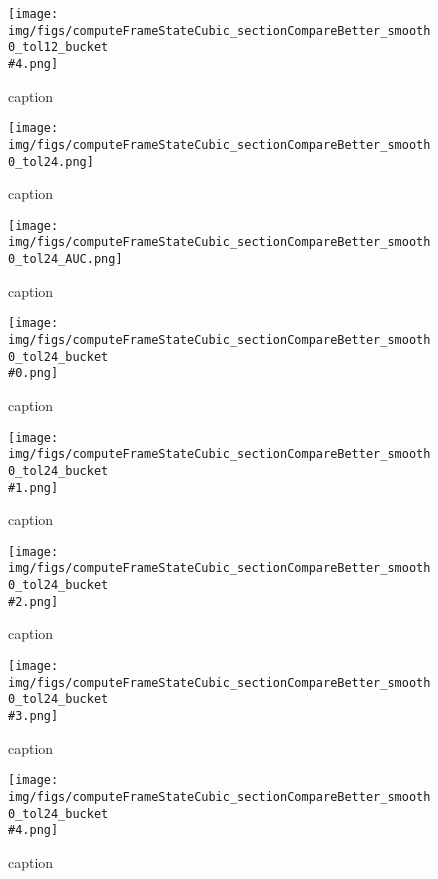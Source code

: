 %
\begin{figure}[!ht]
	\centering
	\texttt{[image: img/figs/computeFrameStateCubic\_sectionCompareBetter\_smooth0\_tol12\_bucket\\\#4.png]}
	\caption{caption}
	\label{fig:computeFrameStateCubic_sectionCompareBetter_smooth0_tol12_bucket\#4.png}
\end{figure}
%
\begin{figure}[!ht]
	\centering
	\texttt{[image: img/figs/computeFrameStateCubic\_sectionCompareBetter\_smooth0\_tol24.png]}
	\caption{caption}
	\label{fig:computeFrameStateCubic_sectionCompareBetter_smooth0_tol24.png}
\end{figure}
%
\begin{figure}[!ht]
	\centering
	\texttt{[image: img/figs/computeFrameStateCubic\_sectionCompareBetter\_smooth0\_tol24\_AUC.png]}
	\caption{caption}
	\label{fig:computeFrameStateCubic_sectionCompareBetter_smooth0_tol24_AUC.png}
\end{figure}
%
\begin{figure}[!ht]
	\centering
	\texttt{[image: img/figs/computeFrameStateCubic\_sectionCompareBetter\_smooth0\_tol24\_bucket\\\#0.png]}
	\caption{caption}
	\label{fig:computeFrameStateCubic_sectionCompareBetter_smooth0_tol24_bucket\#0.png}
\end{figure}
%
\begin{figure}[!ht]
	\centering
	\texttt{[image: img/figs/computeFrameStateCubic\_sectionCompareBetter\_smooth0\_tol24\_bucket\\\#1.png]}
	\caption{caption}
	\label{fig:computeFrameStateCubic_sectionCompareBetter_smooth0_tol24_bucket\#1.png}
\end{figure}
%
\begin{figure}[!ht]
	\centering
	\texttt{[image: img/figs/computeFrameStateCubic\_sectionCompareBetter\_smooth0\_tol24\_bucket\\\#2.png]}
	\caption{caption}
	\label{fig:computeFrameStateCubic_sectionCompareBetter_smooth0_tol24_bucket\#2.png}
\end{figure}
%
\begin{figure}[!ht]
	\centering
	\texttt{[image: img/figs/computeFrameStateCubic\_sectionCompareBetter\_smooth0\_tol24\_bucket\\\#3.png]}
	\caption{caption}
	\label{fig:computeFrameStateCubic_sectionCompareBetter_smooth0_tol24_bucket\#3.png}
\end{figure}
%
\begin{figure}[!ht]
	\centering
	\texttt{[image: img/figs/computeFrameStateCubic\_sectionCompareBetter\_smooth0\_tol24\_bucket\\\#4.png]}
	\caption{caption}
	\label{fig:computeFrameStateCubic_sectionCompareBetter_smooth0_tol24_bucket\#4.png}
\end{figure}
